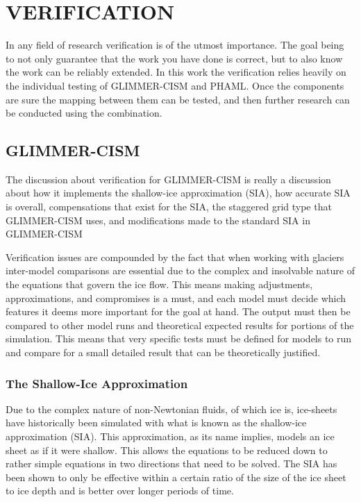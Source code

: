 \section{VERIFICATION} \label{ch:verification}


In any field of research verification is of the utmost importance.  The goal being to not only guarantee that the work you have done is correct, but to also know the work can be reliably extended.  In this work the verification relies heavily on the individual testing of GLIMMER-CISM and PHAML.  Once the components are sure the mapping between them can be tested, and then further research can be conducted using the combination.

\subsection{GLIMMER-CISM}\label{sec:chp5cism}

The discussion about verification for GLIMMER-CISM is really a discussion about how it implements the shallow-ice approximation (SIA), how accurate SIA is overall, compensations that exist for the SIA, the staggered grid type that GLIMMER-CISM uses, and modifications made to the standard SIA in GLIMMER-CISM

Verification issues are compounded by the fact that when working with glaciers inter-model comparisons are essential due to the complex and insolvable nature of the equations that govern the ice flow.  This means making adjustments, approximations, and compromises is a must, and each model must decide which features it deems more important for the goal at hand.  The output must then be compared to other model runs and theoretical expected results for portions of the simulation.  This means that very specific tests must be defined for models to run and compare for a small detailed result that can be theoretically justified.

\subsubsection{The Shallow-Ice Approximation}

Due to the complex nature of non-Newtonian fluids, of which ice is, ice-sheets have historically been simulated with what is known as the shallow-ice approximation (SIA).  This approximation, as its name implies, models an ice sheet as if it were shallow.  This allows the equations to be reduced down to rather simple equations in two directions that need to be solved.  The SIA has been shown to only be effective within a certain ratio of the size of the ice sheet to ice depth and is better over longer periods of time. %

